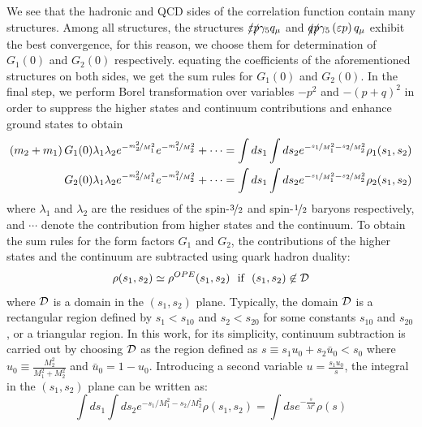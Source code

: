 We see that the hadronic and QCD sides of the correlation function contain many structures. Among all structures, the structures $\slashed{\varepsilon}\slashed{p}\gamma_5 q_\mu$ and $\slashed{q}\slashed{p}\gamma_5\left(\varepsilon p\right)q_\mu$ exhibit the best convergence, for this reason, we choose them for determination of $G_1(0)$ and $G_2(0)$ respectively. equating the coefficients of the aforementioned structures on both sides, we get the sum rules for $G_1(0)$ and $G_2(0)$. In the final step, we perform Borel transformation over variables $-p^2$ and $-(p+q)^2$ in order to suppress the higher states and continuum contributions and enhance ground states to obtain
%
\begin{equation}
    \begin{aligned}
        \left(m_2+m_1\right)G_1(0)\lambda_1\lambda_2e^{-\nicefrac{m_2^2}{M_1^2}}e^{-\nicefrac{m_1^2}{M_2^2}}  +\cdots &= \int ds_1 \int ds_2 e^{-\nicefrac{s_1}{M_1^2}-\nicefrac{s_2}{M_2^2}}\rho_1(s_1,s_2)\\
        G_2(0)\lambda_1\lambda_2e^{-\nicefrac{m_2^2}{M_1^2}}e^{-\nicefrac{m_1^2}{M_2^2}} +\cdots&= \int ds_1 \int ds_2 e^{-\nicefrac{s_1}{M_1^2}-\nicefrac{s_2}{M_2^2}}\rho_2(s_1,s_2)\\
    \end{aligned}
    \label{correlated}
\end{equation}
%
where $\lambda_1$ and $\lambda_2$ are the residues of the spin-$\nicefrac{3}{2}$ and spin-$\nicefrac{1}{2}$ baryons respectively, and $\cdots$ denote the contribution from higher states and the continuum. To obtain the sum rules for the form factors $G_1$ and $G_2$, the contributions of the higher states and the continuum are subtracted using quark hadron duality: 
\begin{equation}
    \rho(s_1,s_2) \simeq \rho^{OPE}(s_1,s_2) ~~\mbox{if}~~ (s_1,s_2) \not\in {\cal D}
\end{equation}
where $\cal D$ is a domain in the $(s_1,s_2)$ plane.
Typically, the domain $\cal D$ is a rectangular region defined by $s_1<s_{10}$ and $s_2<s_{20}$ for some constants $s_{10}$ and $s_{20}$, or a triangular region. In this work, for its simplicity, continuum subtraction is carried out
by choosing $\cal D$ as the region defined as $s \equiv s_1 u_0 + s_2 \bar u_0 < s_0$ where $u_0\equiv \frac{M_2^2}{M_1^2+M_2^2}$ and $\bar u_0 = 1 - u_0$. Introducing a second variable $u=\frac{s_1 u_0}{s}$, the integral in the $(s_1,s_2)$ plane can be written as:
\begin{equation}
    \int ds_1 \int ds_2 e^{-s_1/M_1^2-s_2/M_2^2} \rho(s_1,s_2) = \int ds e^{-\frac{s}{M^2}} \rho(s)
\end{equation}
